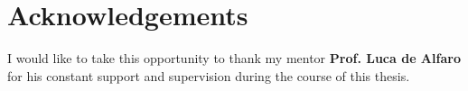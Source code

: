 \chapter*{Acknowledgements}
I would like to take this opportunity to thank my mentor
\textbf{Prof. Luca de Alfaro} for his constant support and
supervision during the course of this thesis.
